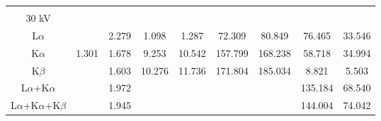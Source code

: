 \begin{table}[ht]
\begin{tabular}{ccccccccc}
        \hline
                                     &         &       &           &           &         &         &         &        \\
        30 kV                        &         &       &           &           &         &         &         &        \\
        L$\alpha$                    &         & 2.279 & 1.098     & 1.287     & 72.309  & 80.849  & 76.465  & 33.546 \\
        K$\alpha$                    & 1.301   & 1.678 & 9.253     & 10.542    & 157.799 & 168.238 & 58.718  & 34.994 \\
        K$\beta$                     &         & 1.603 & 10.276    & 11.736    & 171.804 & 185.034 & 8.821   & 5.503  \\
        L$\alpha$+K$\alpha$          &         & 1.972 &           &           &         &         & 135.184 & 68.540 \\
        L$\alpha$+K$\alpha$+K$\beta$ &         & 1.945 &           &           &         &         & 144.004 & 74.042
    \end{tabular}
\end{table}
